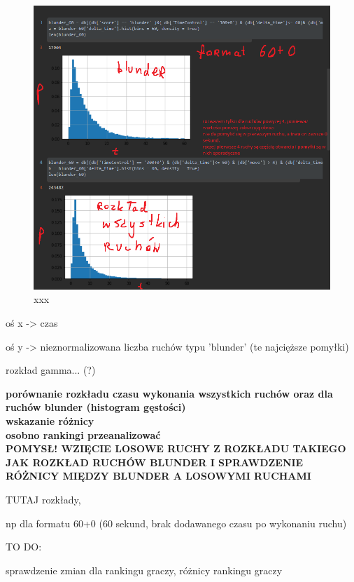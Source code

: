\documentclass[inzynierska]{pwr_wmat_praca_dyplomowa}
\theoremstyle{plain}
\numberwithin{theorem}{chapter}
\theoremstyle{definition}
\numberwithin{theorem}{chapter}
\begin{document}
\begin{figure}[H]
	\centering
	\includegraphics[width=\textwidth]{sample60.png}
	\caption{xxx}\label{xxx}
\end{figure}


oś x -> czas

oś y -> nieznormalizowana liczba ruchów typu 'blunder' (te najcięższe pomyłki)\newline


rozkład gamma... (?)\newline 

\textbf{porównanie rozkładu czasu wykonania wszystkich ruchów oraz dla ruchów blunder (histogram gęstości)\\
	wskazanie różnicy\\
	osobno rankingi przeanalizować}\\

\textbf{POMYSŁ! WZIĘCIE LOSOWE RUCHY Z ROZKŁADU TAKIEGO JAK ROZKŁAD RUCHÓW BLUNDER I SPRAWDZENIE RÓŻNICY MIĘDZY BLUNDER A LOSOWYMI RUCHAMI}




TUTAJ rozkłady, 	

np dla formatu 60+0 (60 sekund, brak dodawanego czasu po wykonaniu ruchu)


TO DO: 

sprawdzenie zmian dla rankingu graczy, różnicy rankingu graczy
\end{document}
